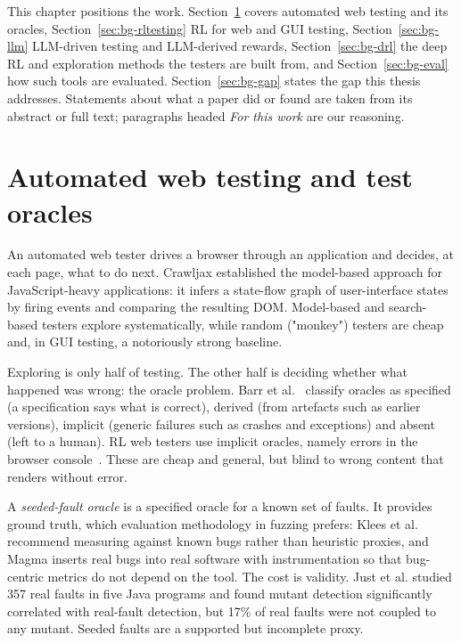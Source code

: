 \label{chap.2}

This chapter positions the work. Section~\ref{sec:bg-webtesting} covers automated web
testing and its oracles, Section~\ref{sec:bg-rltesting} RL for web and GUI testing,
Section~\ref{sec:bg-llm} LLM-driven testing and LLM-derived rewards,
Section~\ref{sec:bg-drl} the deep RL and exploration methods the testers are built from,
and Section~\ref{sec:bg-eval} how such tools are evaluated. Section~\ref{sec:bg-gap} states
the gap this thesis addresses. Statements about what a paper did or found are taken from its
abstract or full text; paragraphs headed \emph{For this work} are our reasoning.

\section{Automated web testing and test oracles}
\label{sec:bg-webtesting}

An automated web tester drives a browser through an application and decides, at each page,
what to do next. Crawljax established the model-based approach for
JavaScript-heavy applications: it infers a state-flow graph of user-interface states by
firing events and comparing the resulting DOM. Model-based and search-based testers explore
systematically, while random ("monkey") testers are cheap and, in GUI testing, a notoriously
strong baseline.

Exploring is only half of testing. The other half is deciding whether what happened was
wrong: the oracle problem. Barr et al.~\cite{barr2015oracle} classify oracles as specified
(a specification says what is correct), derived (from artefacts such as earlier versions),
implicit (generic failures such as crashes and exceptions) and absent (left to a human). RL
web testers use implicit oracles, namely errors in the browser console~\cite{zheng2021webexplor, gu2025webrled}. These are cheap and general, but blind to wrong content that renders without
error.

A \emph{seeded-fault oracle} is a specified oracle for a known set of faults. It provides
ground truth, which evaluation methodology in fuzzing prefers: Klees
et al.~\cite{klees2018evaluating} recommend measuring against known bugs rather than
heuristic proxies, and Magma inserts real bugs into real software with
instrumentation so that bug-centric metrics do not depend on the tool. The cost is validity.
Just et al. studied 357 real faults in five Java programs and found
mutant detection significantly correlated with real-fault detection, but 17\% of real
faults were not coupled to any mutant. Seeded faults are a supported but incomplete proxy.


